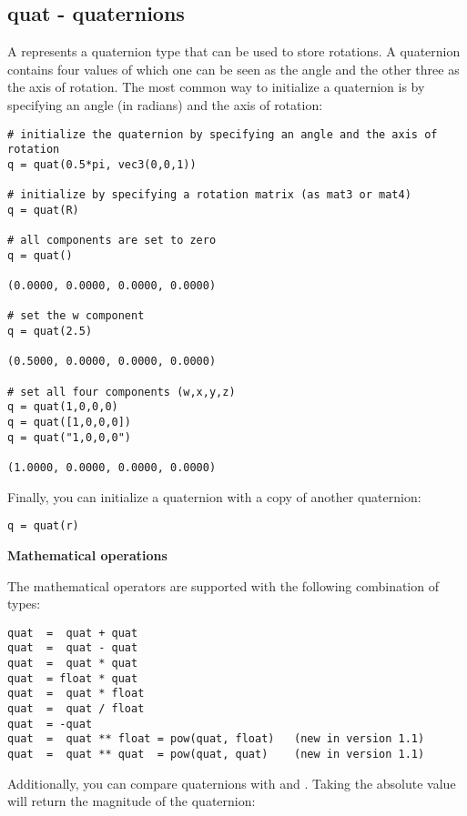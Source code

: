 \subsection{quat - quaternions}
\label{quat}

A  represents a quaternion type that can be used to store
rotations. A quaternion contains four values of which one can be seen
as the angle and the other three as the axis of rotation. The most
common way to initialize a quaternion is by specifying an angle (in
radians) and the axis of rotation:

\begin{verbatim}
# initialize the quaternion by specifying an angle and the axis of rotation
q = quat(0.5*pi, vec3(0,0,1))

# initialize by specifying a rotation matrix (as mat3 or mat4)
q = quat(R)

# all components are set to zero
q = quat()

(0.0000, 0.0000, 0.0000, 0.0000)

# set the w component
q = quat(2.5)

(0.5000, 0.0000, 0.0000, 0.0000)

# set all four components (w,x,y,z)
q = quat(1,0,0,0)
q = quat([1,0,0,0])
q = quat("1,0,0,0")

(1.0000, 0.0000, 0.0000, 0.0000)
\end{verbatim}

Finally, you can initialize a quaternion with a copy of another quaternion:

\begin{verbatim}
q = quat(r)
\end{verbatim}

{\bf Mathematical operations}

The mathematical operators are supported with the following
combination of types:

\begin{verbatim}
quat  =  quat + quat
quat  =  quat - quat
quat  =  quat * quat
quat  = float * quat
quat  =  quat * float
quat  =  quat / float
quat  = -quat
quat  =  quat ** float = pow(quat, float)   (new in version 1.1)
quat  =  quat ** quat  = pow(quat, quat)    (new in version 1.1)
\end{verbatim}

Additionally, you can compare quaternions with \code{==} and \code{!=}. 
Taking the absolute value will return the magnitude of the quaternion:

